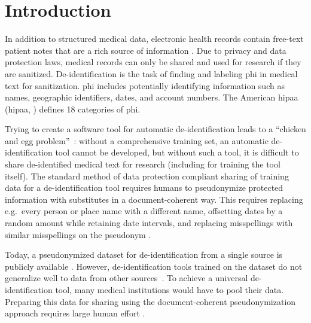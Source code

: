 

\section{Introduction}\label{sec:introduction}
%
In addition to structured medical data, electronic health records contain free-text patient notes that are a rich source of information \citep{jensen2012mining}.
%
Due to privacy and data protection laws, medical records can only be shared and used for research if they are sanitized.
%
De-identification is the task of finding and labeling \ac{phi} in medical text for sanitization.
%
\Ac{phi} includes potentially identifying information such as names, geographic identifiers, dates, and account numbers.
%
The American \acl{hipaa} (\acs{hipaa}, \citeyear{usa1996hipaa}) defines 18 categories of \ac{phi}.

%
Trying to create a software tool for automatic de-identification leads to a ``chicken and egg problem''~\citep{uzuner2007evaluating}: without a comprehensive training set, an automatic de-identification tool cannot be developed, but without such a tool, it is difficult to share de-identified medical text for research (including for training the tool itself).
%
The standard method of data protection compliant sharing of training data for a de-identification tool requires humans to pseudonymize protected information with substitutes in a document-coherent way.
%
This requires replacing e.g.\ every person or place name with a different name, offsetting dates by a random amount while retaining date intervals, and replacing misspellings with similar misspellings on the pseudonym \cite{uzuner2007evaluating}.

%
Today, a pseudonymized dataset for de-identification from a single source is publicly available \citep{stubbs2015annotating}.
%
However, de-identification tools trained on the dataset do not generalize well to data from other sources~\citep{stubbs2017identification}.
%
To achieve a universal de-identification tool, many medical institutions would have to pool their data.
%
Preparing this data for sharing using the document-coherent pseudonymization approach requires large human effort \citep{dernoncourt2017identification}.

